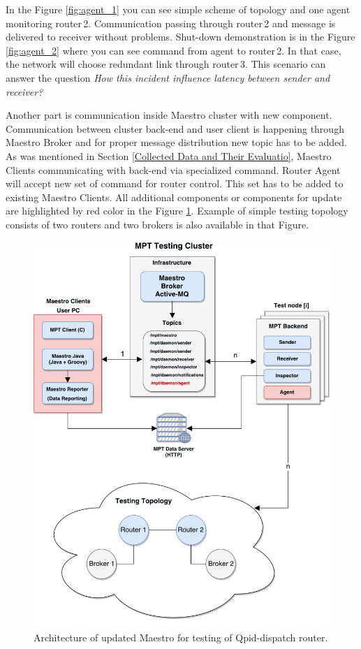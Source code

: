 In the Figure \ref{fig:agent_1} you can see simple scheme of topology and one agent monitoring router\,2. Communication passing through router\,2 and message is delivered to receiver without problems. Shut-down demonstration is in the Figure \ref{fig:agent_2} where you can see command from agent to router\,2. In that case, the network will choose redundant link through router\,3. This scenario can answer the question \emph{How this incident influence latency between sender and receiver?}

Another part is communication inside Maestro cluster with new component. Communication between cluster back-end and user client is happening through Maestro Broker and for proper message distribution new topic has to be added. As was mentioned in Section \ref{Collected Data and Their Evaluatio}, Maestro Clients communicating with back-end via specialized command. Router Agent will accept new set of command for router control. This set has to be added to existing Maestro Clients. All additional components or components for update are highlighted by red color in the Figure \ref{fig:msg_perf_tool_update}. Example of simple testing topology consists of two routers and two brokers is also available in that Figure.


\begin{figure}[]
  \centering
  \includegraphics[width=15cm]{obrazky-figures/msg_perf_tool_for_router.pdf}
  \caption{Architecture of updated Maestro for testing of Qpid-dispatch router.}
  \label{fig:msg_perf_tool_update}
\end{figure}


